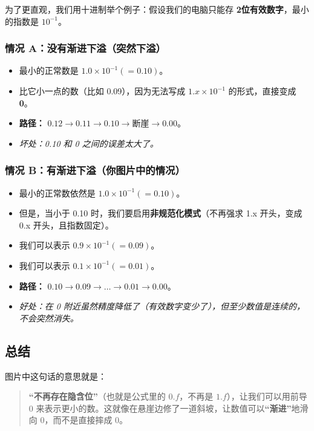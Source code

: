 为了更直观，我们用十进制举个例子：假设我们的电脑只能存 \textbf{2位有效数字}，最小的指数是 $10^{-1}$。

\subsubsection*{情况 A：没有渐进下溢（突然下溢）}
\begin{itemize}
    \item 最小的正常数是 $1.0 \times 10^{-1} (= 0.10)$。
    \item 比它小一点的数（比如 0.09），因为无法写成 $1.x \times 10^{-1}$ 的形式，直接变成 \textbf{0}。
    \item \textbf{路径：} $0.12 \to 0.11 \to 0.10 \to \textbf{断崖} \to 0.00$。
    \item \textit{坏处：0.10 和 0 之间的误差太大了。}
\end{itemize}

\subsubsection*{情况 B：有渐进下溢（你图片中的情况）}
\begin{itemize}
    \item 最小的正常数依然是 $1.0 \times 10^{-1} (= 0.10)$。
    \item 但是，当小于 0.10 时，我们要启用\textbf{非规范化模式}（不再强求 1.x 开头，变成 0.x 开头，且指数固定）。
    \item 我们可以表示 $0.9 \times 10^{-1} (= 0.09)$。
    \item 我们可以表示 $0.1 \times 10^{-1} (= 0.01)$。
    \item \textbf{路径：} $0.10 \to 0.09 \to \dots \to 0.01 \to 0.00$。
    \item \textit{好处：在 0 附近虽然精度降低了（有效数字变少了），但至少数值是连续的，不会突然消失。}
\end{itemize}

\subsection*{总结}

图片中这句话的意思就是：
\begin{quote}
    \textbf{“不再存在隐含位”}（也就是公式里的 $0.f$，不再是 $1.f$），让我们可以用前导 0 来表示更小的数。这就像在悬崖边修了一道斜坡，让数值可以\textbf{“渐进”}地滑向 0，而不是直接摔成 0。
\end{quote}





































